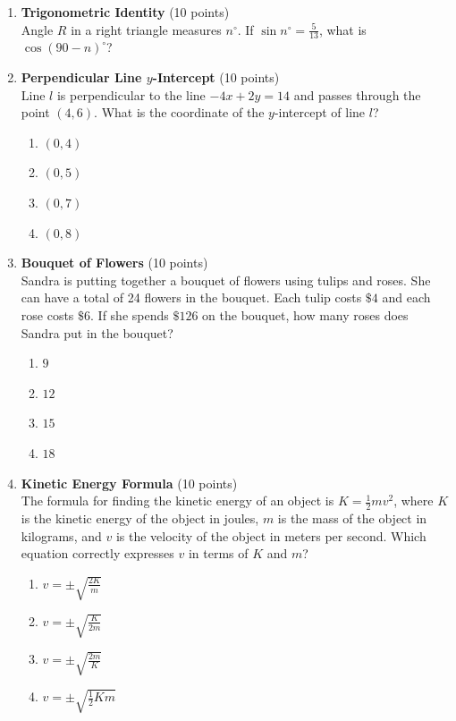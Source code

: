 \begin{enumerate}
  \item \textbf{Trigonometric Identity} (10 points)\\
  Angle $R$ in a right triangle measures $n^\circ$. If $\sin n^\circ = \frac{5}{13}$, what is $\cos (90 - n)^\circ$?
  \begin{subanswer}
  \end{subanswer}

  \item \textbf{Perpendicular Line $y$-Intercept} (10 points)\\
  Line $l$ is perpendicular to the line $-4x + 2y = 14$ and passes through the point $(4, 6)$. What is the coordinate of the $y$-intercept of line $l$?
  \begin{enumerate}[label=\Alph*.]
    \item $(0, 4)$
    \item $(0, 5)$
    \item $(0, 7)$
    \item $(0, 8)$
  \end{enumerate}
  \begin{subanswer}
  \end{subanswer}

  \item \textbf{Bouquet of Flowers} (10 points)\\
  Sandra is putting together a bouquet of flowers using tulips and roses. She can have a total of 24 flowers in the bouquet. Each tulip costs $\$4$ and each rose costs $\$6$. If she spends $\$126$ on the bouquet, how many roses does Sandra put in the bouquet?
  \begin{enumerate}[label=\Alph*.]
    \item $9$
    \item $12$
    \item $15$
    \item $18$
  \end{enumerate}
  \begin{subanswer}
  \end{subanswer}

  \item \textbf{Kinetic Energy Formula} (10 points)\\
  The formula for finding the kinetic energy of an object is $K = \frac{1}{2}mv^2$, where $K$ is the kinetic energy of the object in joules, $m$ is the mass of the object in kilograms, and $v$ is the velocity of the object in meters per second. Which equation correctly expresses $v$ in terms of $K$ and $m$?
  \begin{enumerate}[label=\Alph*.]
    \item $v = \pm \sqrt{\frac{2K}{m}}$
    \item $v = \pm \sqrt{\frac{K}{2m}}$
    \item $v = \pm \sqrt{\frac{2m}{K}}$
    \item $v = \pm \sqrt{\frac{1}{2}Km}$
  \end{enumerate}
  \begin{subanswer}
  \end{subanswer}


\end{enumerate}
